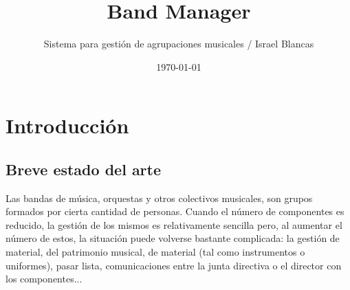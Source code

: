 \documentclass[11pt,spanish]{article}
\title{Band Manager}
\author{Sistema para gestión de agrupaciones musicales
        \newline / Israel Blancas}
\date{\today}
\begin{document}
\maketitle

\tableofcontents
\clearpage

\section{Introducción}

\subsection{Breve estado del arte}

\noindent
Las bandas de música, orquestas y otros colectivos musicales, son grupos
formados por cierta cantidad de personas. Cuando el número de componentes es reducido,
la gestión de los mismos es relativamente sencilla pero, al aumentar el número de estos,
la situación puede volverse bastante complicada: la gestión de material, del patrimonio
musical, de material (tal como instrumentos o uniformes),
pasar lista, comunicaciones entre la junta directiva o el director con los componentes...
\end{document}
